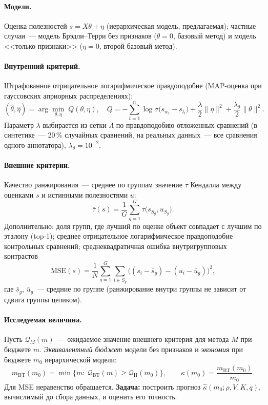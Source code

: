 \documentclass{article}
\theoremstyle{definition}
\theoremstyle{remark}
\newcommand{\mBT}{m_{\mathrm{BT}}}
\begin{document}
\paragraph{Модели.}
Оценка полезностей $s=X\theta+\eta$ (иерархическая модель, предлагаемая); частные случаи~--- модель Брэдли--Терри без признаков ($\theta=0$, базовый метод) и модель <<только признаки>> ($\eta=0$, второй базовый метод).

\paragraph{Внутренний критерий.}
Штрафованное отрицательное логарифмическое правдоподобие (MAP-оценка при гауссовских априорных распределениях):
\begin{equation}\label{eq:criterion}
(\hat\theta,\hat\eta)=\arg\min_{\theta,\eta}\; Q(\theta,\eta),\quad
Q=-\sum_{t=1}^{n}\log\sigma\bigl(s_{w_t}-s_{l_t}\bigr)+\frac{\lambda}{2}\|\eta\|^2+\frac{\lambda_\theta}{2}\|\theta\|^2 .
\end{equation}
Параметр $\lambda$ выбирается из сетки $\Lambda$ по правдоподобию отложенных сравнений (в синтетике~--- 20\,\% случайных сравнений, на реальных данных~--- все сравнения одного аннотатора), $\lambda_\theta=10^{-2}$.

\paragraph{Внешние критерии.}
Качество ранжирования~--- среднее по группам значение $\tau$ Кендалла между оценками $s$ и истинными полезностями $u$:
\begin{equation}\label{eq:tau}
\bar\tau(s)=\frac1G\sum_{g=1}^{G}\tau\bigl(s_{S_g},u_{S_g}\bigr).
\end{equation}
Дополнительно: доля групп, где лучший по оценке объект совпадает с лучшим по эталону (top-1); среднее отрицательное логарифмическое правдоподобие контрольных сравнений; среднеквадратичная ошибка внутригрупповых контрастов
\begin{equation}\label{eq:mse}
\mathrm{MSE}(s)=\frac1N\sum_{g=1}^{G}\sum_{i\in S_g}\bigl((s_i-\bar s_g)-(u_i-\bar u_g)\bigr)^2,
\end{equation}
где $\bar s_g$, $\bar u_g$~--- средние по группе (ранжирование внутри группы не зависит от сдвига группы целиком).

\paragraph{Исследуемая величина.}
Пусть $\mathcal Q_M(m)$~--- ожидаемое значение внешнего критерия для метода $M$ при бюджете $m$. \emph{Эквивалентный бюджет} модели без признаков и \emph{экономия} при бюджете $m_0$ иерархической модели:
\begin{equation}\label{eq:saving}
\mBT(m_0)=\min\bigl\{m:\ \mathcal Q_{\mathrm{BT}}(m)\ge \mathcal Q_{\mathrm H}(m_0)\bigr\},\qquad
\kappa(m_0)=\frac{\mBT(m_0)}{m_0}.
\end{equation}
Для MSE неравенство обращается. \textbf{Задача:} построить прогноз $\hat\kappa(m_0;\rho,V,K,q)$, вычислимый до сбора данных, и оценить его точность.
\end{document}
